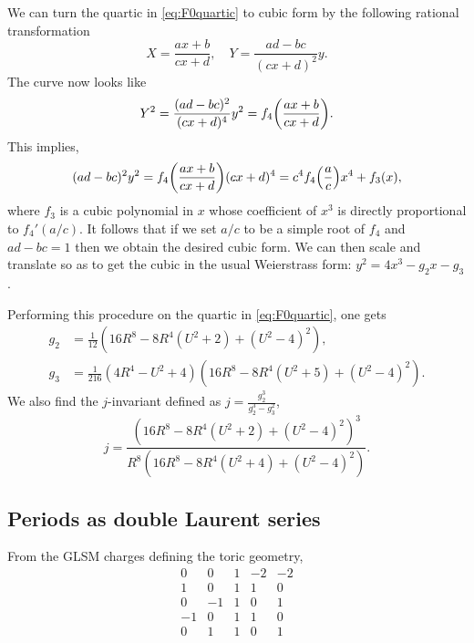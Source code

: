 \documentclass[11pt, a4paper]{article}
\numberwithin{equation}{section}
\begin{document}
We can turn the quartic in \cref{eq:F0quartic} to cubic form by the following rational transformation
\begin{equation}
  X = \frac{a x + b}{c x + d}, \quad Y = \frac{a d - b c}{(c x + d)^2} y.
\end{equation}
The curve now looks like
\begin{equation}
  Y^2 = \frac{(a d - b c)^2}{(c x + d)^4} y^2 = f_4\qty(\frac{a x + b}{c x + d}).
\end{equation}
This implies,
\begin{equation}
  (a d - b c)^2 y^2 = f_4\qty(\frac{a x + b}{c x + d})(c x + d)^4 = c^4 f_4\qty(\frac{a}{c}) x^4 + f_3(x),
\end{equation}
where $f_3$ is a cubic polynomial in $x$ whose coefficient of $x^3$ is directly proportional to $f_4'(a/c)$. It follows that if we set $a/c$ to be a simple root of $f_4$ and $a d - b c = 1$ then we obtain the desired cubic form. We can then scale and translate so as to get the cubic in the usual Weierstrass form: $y^2 = 4 x^3 - g_2 x - g_3$.

Performing this procedure on the quartic in \cref{eq:F0quartic}, one gets
\begin{equation}
  \begin{aligned}
    g_2 &= \frac{1}{12} \left(16 R^8-8 R^4 \left(U^2+2\right)+\left(U^2-4\right)^2\right), \\
    g_3 &= \frac{1}{216} \left(4 R^4-U^2+4\right) \left(16 R^8-8 R^4 \left(U^2+5\right)+\left(U^2-4\right)^2\right).
  \end{aligned}
\end{equation}
We also find the $j$-invariant defined as $j = \frac{g_2^3}{g_2^3 - g_3^2}$,
\begin{equation}
  j = \frac{\left(16 R^8-8 R^4 \left(U^2+2\right)+\left(U^2-4\right)^2\right)^3}{R^8 \left(16 R^8-8 R^4 \left(U^2+4\right)+\left(U^2-4\right)^2\right)}.
\end{equation}

\subsection{Periods as double Laurent series}
From the GLSM charges defining the toric geometry, 
\begin{equation}
    \begin{array}{ccc|cc} 
    0 & 0 & 1 & -2 & -2 \\
    1 & 0 & 1 & 1 & 0 \\
    0 & -1 & 1 & 0 &1 \\
   -1 & 0 & 1 & 1 & 0 \\
   0  & 1 & 1 & 0 & 1 \\
   \end{array}
\end{equation}
\end{document}
